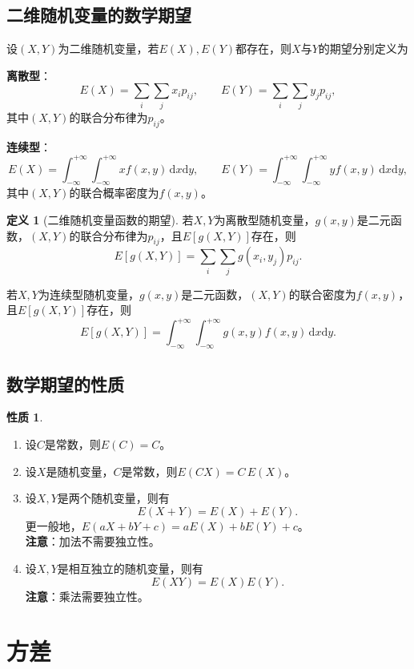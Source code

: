 \documentclass[11pt,a4paper]{report}
\theoremstyle{definition}
\newtheorem{definition}{定义}[chapter]
\newtheorem{property}{性质}[chapter]
\theoremstyle{plain}
\begin{document}
\subsection{二维随机变量的数学期望}

设$(X,Y)$为二维随机变量，若$E(X),E(Y)$都存在，则$X$与$Y$的期望分别定义为

\textbf{离散型}：
\[
E(X)=\sum_{i}\sum_{j}x_i p_{ij},\qquad E(Y)=\sum_{i}\sum_{j}y_j p_{ij},
\]
其中$(X,Y)$的联合分布律为$p_{ij}$。

\textbf{连续型}：
\[
E(X)=\int_{-\infty}^{+\infty}\int_{-\infty}^{+\infty}x f(x,y)\,\mathrm{d}x\mathrm{d}y,\qquad
E(Y)=\int_{-\infty}^{+\infty}\int_{-\infty}^{+\infty}y f(x,y)\,\mathrm{d}x\mathrm{d}y,
\]
其中$(X,Y)$的联合概率密度为$f(x,y)$。

\begin{definition}[二维随机变量函数的期望]
若$X,Y$为离散型随机变量，$g(x,y)$是二元函数，$(X,Y)$的联合分布律为$p_{ij}$，且$E[g(X,Y)]$存在，则
\[
E[g(X,Y)]=\sum_{i}\sum_{j}g(x_i,y_j)p_{ij}.
\]

若$X,Y$为连续型随机变量，$g(x,y)$是二元函数，$(X,Y)$的联合密度为$f(x,y)$，且$E[g(X,Y)]$存在，则
\[
E[g(X,Y)]=\int_{-\infty}^{+\infty}\int_{-\infty}^{+\infty}g(x,y)f(x,y)\,\mathrm{d}x\mathrm{d}y.
\]
\end{definition}

\subsection{数学期望的性质}

\begin{property}
\begin{enumerate}[label=\arabic*.,leftmargin=2em]
    \item 设$C$是常数，则$E(C)=C$。
    \item 设$X$是随机变量，$C$是常数，则$E(CX)=C\,E(X)$。
    \item 设$X,Y$是两个随机变量，则有
    \[
    E(X+Y)=E(X)+E(Y).
    \]
    更一般地，$E(aX+bY+c)=aE(X)+bE(Y)+c$。\\
    \textbf{注意}：加法不需要独立性。
    \item 设$X,Y$是相互独立的随机变量，则有
    \[
    E(XY)=E(X)E(Y).
    \]
    \textbf{注意}：乘法需要独立性。
\end{enumerate}
\end{property}

\section{方差}
\end{document}
